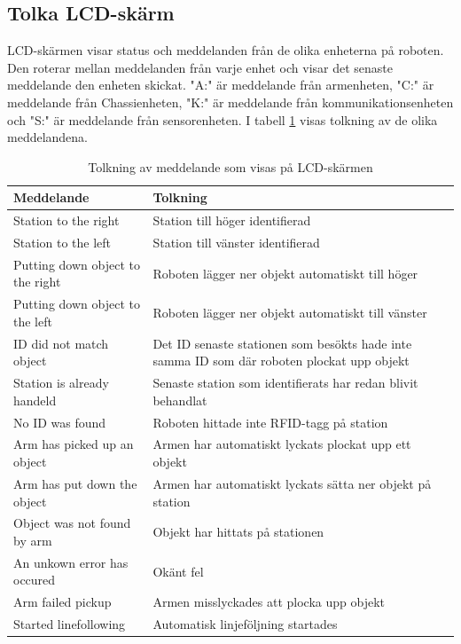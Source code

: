 \documentclass[a4paper,12pt]{article}
\begin{document}
\subsection{Tolka LCD-skärm}
LCD-skärmen visar status och meddelanden från de olika enheterna på roboten. Den roterar mellan meddelanden från varje enhet och visar det senaste meddelande den enheten skickat. "A:" är meddelande från armenheten, "C:" är meddelande från Chassienheten, "K:" är meddelande från kommunikationsenheten och "S:" är meddelande från sensorenheten. 
I tabell \ref{tab:lcd} visas tolkning av de olika meddelandena.

\begin{table}[H]
\centering
    \begin{tabularx}{\textwidth}{|l|X|}
        \hline \textbf{Meddelande} & \textbf{Tolkning} \\ \hline
    Station to the right & Station till höger identifierad \\ \hline
    Station to the left & Station till vänster identifierad \\ \hline
    Putting down object to the right & Roboten lägger ner objekt automatiskt till höger\\ \hline
    Putting down object to the left & Roboten lägger ner objekt automatiskt till vänster \\ \hline
    ID did not match object & Det ID senaste stationen som besökts hade inte samma ID som där roboten plockat upp objekt \\ \hline
    Station is already handeld & Senaste station som identifierats har redan blivit behandlat\\ \hline
    No ID was found & Roboten hittade inte RFID-tagg på station \\ \hline
    Arm has picked up an object & Armen har automatiskt lyckats plockat upp ett objekt\\ \hline
    Arm has put down the object & Armen har automatiskt lyckats sätta ner objekt på station \\ \hline
    Object was not found by arm & Objekt har hittats på stationen \\ \hline
    An unkown error has occured & Okänt fel \\ \hline
    Arm failed pickup & Armen misslyckades att plocka upp objekt \\ \hline
    Started linefollowing & Automatisk linjeföljning startades \\ \hline
    \end{tabularx}
\caption{Tolkning av meddelande som visas på LCD-skärmen}
\label{tab:lcd}
\end{table}
\end{document}
